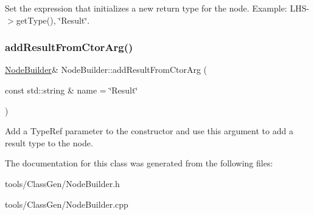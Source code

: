 Set the expression that initializes a new return type for the node. Example\+: \textquotesingle{}L\+H\+S-\/$>$get\+Type()\textquotesingle{}, \char`\"{}\+Result\char`\"{}. \mbox{\label{class_node_builder_a62ee041879e95ec36c120159e4dc2277}} 
\subsubsection{\texorpdfstring{add\+Result\+From\+Ctor\+Arg()}{addResultFromCtorArg()}}
{\footnotesize\ttfamily \hyperlink{class_node_builder}{Node\+Builder}\& Node\+Builder\+::add\+Result\+From\+Ctor\+Arg (\begin{DoxyParamCaption}\item[{const std\+::string \&}]{name = {\ttfamily \char`\"{}Result\char`\"{}} }\end{DoxyParamCaption})\hspace{0.3cm}{\ttfamily [inline]}}

Add a Type\+Ref parameter to the constructor and use this argument to add a result type to the node. 

The documentation for this class was generated from the following files\+:\begin{DoxyCompactItemize}
\item 
tools/\+Class\+Gen/Node\+Builder.\+h\item 
tools/\+Class\+Gen/Node\+Builder.\+cpp\end{DoxyCompactItemize}
